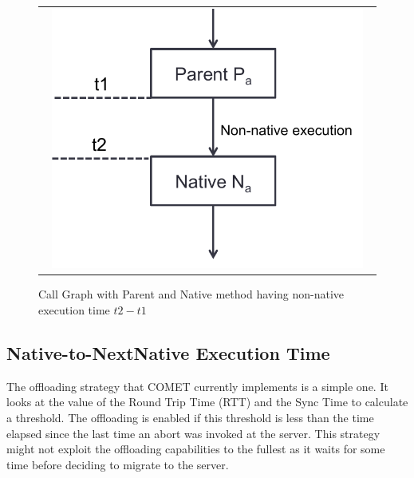 \begin{figure} [thf*]
\centering
\begin{tabular}{c}
\begin{minipage}[b]{0.5\textwidth}
\includegraphics[width=0.95\textwidth]{figs/parent_native.pdf}
\end{minipage}
\end{tabular}
\caption{Call Graph with Parent and Native method having non-native execution time $t2-t1$}
\label{fig:parent_native}
\end{figure}
\subsection{Native-to-NextNative Execution Time}
The offloading strategy that COMET currently implements is a simple one. It looks at the value of the Round Trip Time (RTT) and
the Sync Time to calculate a threshold. The offloading is enabled if this threshold is less than the time elapsed since the last
time an abort was invoked at the server. This strategy might not exploit the offloading capabilities to the fullest as it waits for
some time before deciding to migrate to the server.

